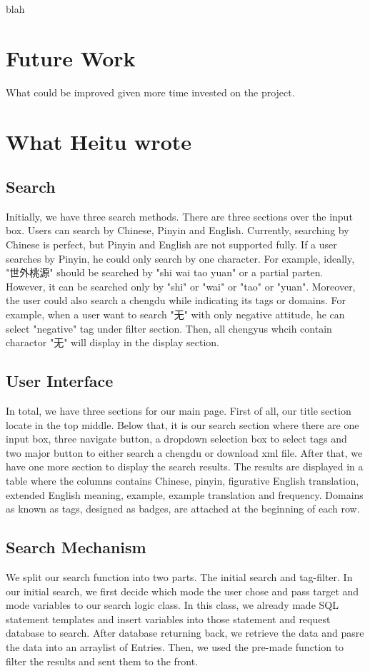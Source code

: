 \documentclass[11pt]{article} %
\begin{document}
\indent blah\\

\section{Future Work}

\indent What could be improved given more time invested on the project. 

\section{What Heitu wrote}
\subsection{Search}
\indent Initially, we have three search methods. There are three sections over the input box. Users can search by Chinese, Pinyin and English. Currently, searching by Chinese is perfect, but Pinyin and English are not supported fully. If a user searches by Pinyin, he could only search by one character. For example, ideally, "世外桃源" should be searched by "shi wai tao yuan" or a partial parten. However, it can be searched only by "shi" or "wai" or "tao" or "yuan". Moreover, the user could also search a chengdu while indicating its tags or domains. For example, when a user want to search "无" with only negative attitude, he can select "negative" tag under filter section. Then, all chengyus whcih contain charactor "无" will display in the display section. 

\subsection{User Interface}
\indent In total, we have three sections for our main page. First of all, our title section locate in the top middle. Below that, it is our search section where there are one input box, three navigate button, a dropdown selection box to select tags and two major button to either search a chengdu or download xml file. After that, we have one more section to display the search results. The results are displayed in a table where the columns contains Chinese, pinyin, figurative English translation, extended English meaning, example, example translation and frequency. Domains as known as tags, designed as badges, are attached at the beginning of each row.

\subsection{Search Mechanism}
\indent We split our search function into two parts. The initial search and tag-filter. In our initial search, we first decide which mode the user chose and pass target and mode variables to our search logic class. In this class, we already made SQL statement templates and insert variables into those statement and request database to search. After database returning back, we retrieve the data and pasre the data into an arraylist of Entries. Then, we used the pre-made function to filter the results and sent them to the front.
\end{document}

